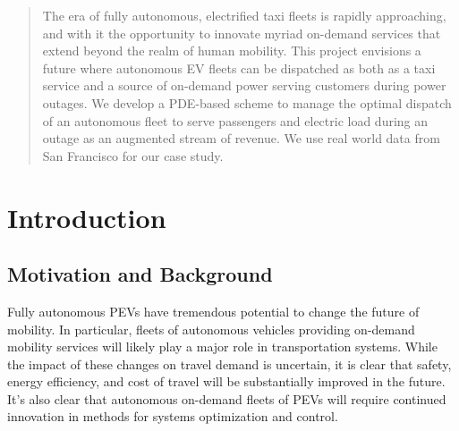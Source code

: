 \documentclass[journal]{IEEEtran}
\begin{document}




\maketitle


\begin{abstract}
The era of fully autonomous, electrified taxi fleets is rapidly approaching, and with it the opportunity to innovate myriad on-demand services that extend beyond the realm of human mobility. This project envisions a future where autonomous EV fleets can be dispatched as both as a taxi service and a source of on-demand power serving customers during power outages. We develop a PDE-based scheme to manage the optimal dispatch of an autonomous fleet to serve passengers and electric load during an outage as an augmented stream of revenue. We use real world data from San Francisco for our case study.
\end{abstract}




%
\IEEEpeerreviewmaketitle

\section{Introduction}

\subsection{Motivation and Background}
Fully autonomous PEVs have tremendous potential to change the future of mobility. In particular, fleets of autonomous vehicles providing on-demand mobility services will likely play a major role in transportation systems. While the impact of these changes on travel demand is uncertain, it is clear that safety, energy efficiency, and cost of travel will be substantially improved in the future. It's also clear that autonomous on-demand fleets of PEVs will require continued innovation in methods for systems optimization and control.
\end{document}
